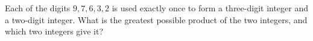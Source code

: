 Each of the digits $9,7,6,3,2$ is used exactly once to form a three-digit integer and a two-digit integer. What is the greatest possible product of the two integers, and which two integers give it?
